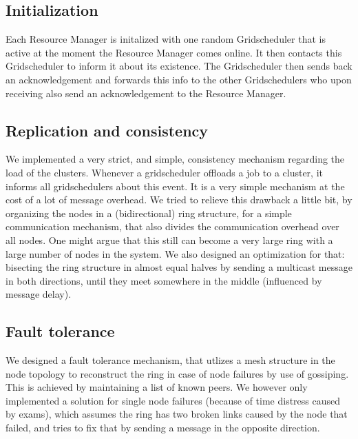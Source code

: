 \documentclass[twocolumn,a4paper]{article}
\begin{document}
\subsection{Initialization}
Each Resource Manager is initalized with one random Gridscheduler that is active at the moment the Resource Manager comes online. It then contacts this Gridscheduler to inform it about its existence. The Gridscheduler then sends back an acknowledgement and forwards this info to the other Gridschedulers who upon receiving also send an acknowledgement to the Resource Manager.

\subsection{Replication and consistency}
We implemented a very strict, and simple, consistency mechanism regarding the load of the clusters. Whenever a gridscheduler offloads a job to a cluster, it informs all gridschedulers about this event. It is a very simple mechanism at the cost of a lot of message overhead. We tried to relieve this drawback a little bit, by organizing the nodes in a (bidirectional) ring structure, for a simple communication mechanism, that also divides the communication overhead over all nodes. One might argue that this still can become a very large ring with a large number of nodes in the system. We also designed an optimization for that: bisecting the ring structure in almost equal halves by sending a multicast message in both directions, until they meet somewhere in the middle (influenced by message delay).

\subsection{Fault tolerance}
We designed a fault tolerance mechanism, that utlizes a mesh structure in the node topology to reconstruct the ring in case of node failures by use of gossiping. This is achieved by maintaining a list of known peers. We however only implemented a solution for single node failures (because of time distress caused by exams), which assumes the ring has two broken links caused by the node that failed, and tries to fix that by sending a message in the opposite direction.
\end{document}
